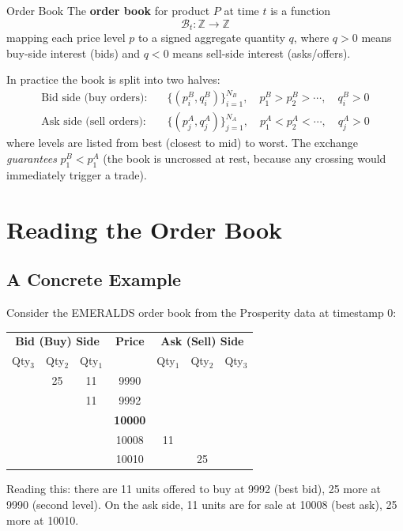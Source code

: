 \documentclass[12pt,a4paper,openany]{report}
\theoremstyle{definition}
\begin{document}
\begin{definitionbox}{Order Book}
The \textbf{order book} for product $P$ at time $t$ is a function
\[
  \mathcal{B}_t : \mathbb{Z} \to \mathbb{Z}
\]
mapping each price level $p$ to a signed aggregate quantity $q$, where $q > 0$ means buy-side interest (bids) and $q < 0$ means sell-side interest (asks/offers).
\end{definitionbox}

In practice the book is split into two halves:
\begin{align*}
  \text{Bid side (buy orders):} \quad & \{(p_i^B, q_i^B)\}_{i=1}^{N_B}, \quad p_1^B > p_2^B > \cdots, \quad q_i^B > 0 \\
  \text{Ask side (sell orders):} \quad & \{(p_j^A, q_j^A)\}_{j=1}^{N_A}, \quad p_1^A < p_2^A < \cdots, \quad q_j^A > 0
\end{align*}
where levels are listed from best (closest to mid) to worst. The exchange \emph{guarantees} $p_1^B < p_1^A$ (the book is uncrossed at rest, because any crossing would immediately trigger a trade).

\section{Reading the Order Book}

\subsection{A Concrete Example}

Consider the EMERALDS order book from the Prosperity data at timestamp 0:

\begin{center}
\begin{tabular}{ccc|c|ccc}
\toprule
\multicolumn{3}{c|}{\textbf{Bid (Buy) Side}} & \textbf{Price} & \multicolumn{3}{c}{\textbf{Ask (Sell) Side}} \\
Qty$_3$ & Qty$_2$ & Qty$_1$ & & Qty$_1$ & Qty$_2$ & Qty$_3$ \\
\midrule
 & 25 & 11 & 9990 & & & \\
 & & 11 & 9992 & & & \\
 & & & \textbf{10000} & & & \\
 & & & 10008 & 11 & & \\
 & & & 10010 & & 25 & \\
\bottomrule
\end{tabular}
\end{center}

Reading this: there are 11 units offered to buy at 9992 (best bid), 25 more at 9990 (second level). On the ask side, 11 units are for sale at 10008 (best ask), 25 more at 10010.
\end{document}

